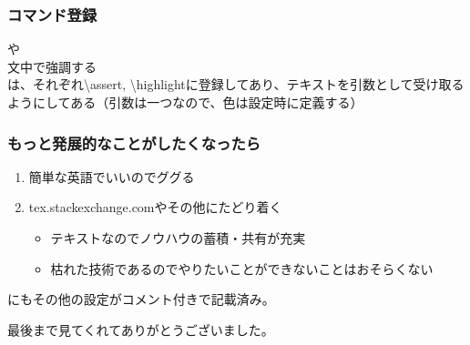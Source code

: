 \begin{frame}
\begin{figure}[!h]
    \end{figure}
\end{frame}

\begin{frame}
  \frametitle{コマンド登録}
    \indent や\\
    \indent 文中で強調する\\
    \indent は、それぞれ\textbackslash assert,  \textbackslash highlightに登録してあり、テキストを引数として受け取るようにしてある（引数は一つなので、色は設定時に定義する）
\end{frame}

\begin{frame}
  \frametitle{もっと発展的なことがしたくなったら}
    \begin{enumerate}
        \item 簡単な英語でいいのでググる
        \item tex.stackexchange.comやその他にたどり着く
        \begin{itemize}
        \item テキストなのでノウハウの蓄積・共有が充実
        \item 枯れた技術であるのでやりたいことができないことはおそらくない
        \end{itemize}
    \end{enumerate}
    \medskip
    にもその他の設定がコメント付きで記載済み。
\end{frame}

\color{white}
\begin{frame}[plain]
    \indent \Large{最後まで見てくれてありがとうございました。}
    \color{black}
\end{frame}
